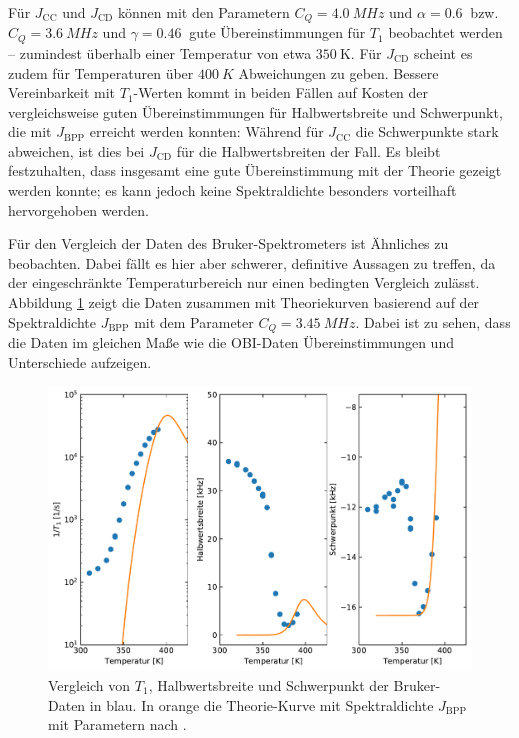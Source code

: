 Für $J_\text{CC}$ und $J_\text{CD}$ können mit den Parametern $C_Q = \SI{4.0}{MHz}$ und $\alpha = \SI{0.6}{}$ bzw. $C_Q = \SI{3.6}{MHz}$ und $\gamma = \SI{0.46}{}$ gute Übereinstimmungen für $T_1$ beobachtet werden -- zumindest überhalb einer Temperatur von etwa $\SI{350}{\kelvin}$. Für $J_\text{CD}$ scheint es zudem für Temperaturen über $\SI{400}{K}$ Abweichungen zu geben. Bessere Vereinbarkeit mit $T_1$-Werten kommt in beiden Fällen auf Kosten der vergleichsweise guten Übereinstimmungen für Halbwertsbreite und Schwerpunkt, die mit $J_\text{BPP}$ erreicht werden konnten: Während für $J_\text{CC}$ die Schwerpunkte stark abweichen, ist dies bei $J_\text{CD}$ für die Halbwertsbreiten der Fall. Es bleibt festzuhalten, dass insgesamt eine gute Übereinstimmung mit der Theorie gezeigt werden konnte; es kann jedoch keine Spektraldichte besonders vorteilhaft hervorgehoben werden.

Für den Vergleich der Daten des Bruker-Spektrometers ist Ähnliches zu beobachten. Dabei fällt es hier aber schwerer, definitive Aussagen zu treffen, da der eingeschränkte Temperaturbereich nur einen bedingten Vergleich zulässt. Abbildung \ref{fig:res:theorie_bruker} zeigt die Daten zusammen mit Theoriekurven basierend auf der Spektraldichte $J_\text{BPP}$ mit dem Parameter $C_Q = \SI{3.45}{MHz}$. Dabei ist zu sehen, dass die Daten im gleichen Maße wie die OBI-Daten Übereinstimmungen und Unterschiede aufzeigen.
\begin{figure}
	\begin{center}
		\includegraphics[width=.9\textwidth]{graphics/plot/Bruker_J_01.pdf}
	\end{center}
	\caption{Vergleich von $T_1$, Halbwertsbreite und Schwerpunkt der Bruker-Daten in blau. In orange die Theorie-Kurve mit Spektraldichte $J_\text{BPP}$ mit Parametern nach \cite{PIMENOV199793}.} \label{fig:res:theorie_bruker}
\end{figure}


